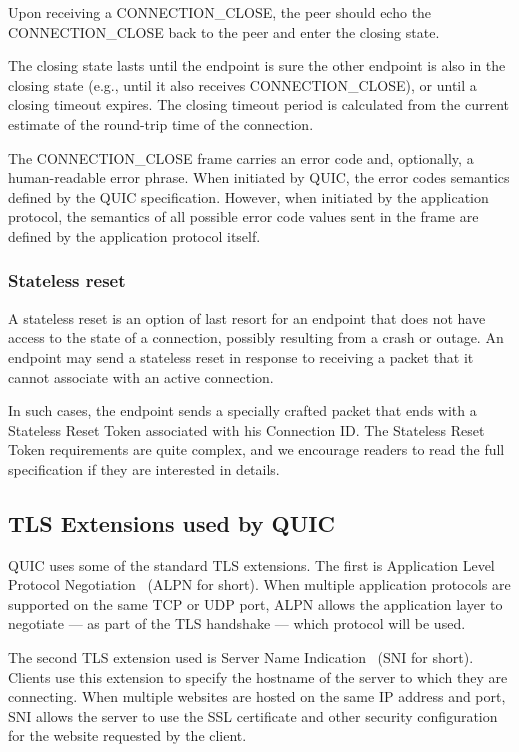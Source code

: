 Upon receiving a CONNECTION\_CLOSE, the peer should echo the CONNECTION\_CLOSE back to the peer and
enter the closing state.

The closing state lasts until the endpoint is sure the other endpoint is also in the closing state
(e.g., until it also receives CONNECTION\_CLOSE), or until a closing timeout expires. The closing
timeout period is calculated from the current estimate of the round-trip time of the connection.

The CONNECTION\_CLOSE frame carries an error code and, optionally, a human-readable error phrase.
When initiated by QUIC, the error codes semantics defined by the QUIC specification. However, when
initiated by the application protocol, the semantics of all possible error code values sent in the
frame are defined by the application protocol itself.

\subsubsection{Stateless reset}

A stateless reset is an option of last resort for an endpoint that does not have access to the state
of a connection, possibly resulting from a crash or outage. An endpoint may send a stateless reset
in response to receiving a packet that it cannot associate with an active connection.

In such cases, the endpoint sends a specially crafted packet that ends with a Stateless Reset Token
associated with his Connection ID\@. The Stateless Reset Token requirements are quite complex, and
we encourage readers to read the full specification if they are interested in details. 

\subsection{TLS Extensions used by QUIC}

QUIC uses some of the standard TLS extensions. The first is Application Level Protocol
Negotiation~\cite{rfc7301} (ALPN for short). When multiple application protocols are supported on
the same TCP or UDP port, ALPN allows the application layer to negotiate --- as part of the TLS
handshake --- which protocol will be used.

The second TLS extension used is Server Name Indication~\cite{rfc6066} (SNI for short). Clients use
this extension to specify the hostname of the server to which they are connecting. When multiple
websites are hosted on the same IP address and port, SNI allows the server to use the SSL
certificate and other security configuration for the website requested by the client.


